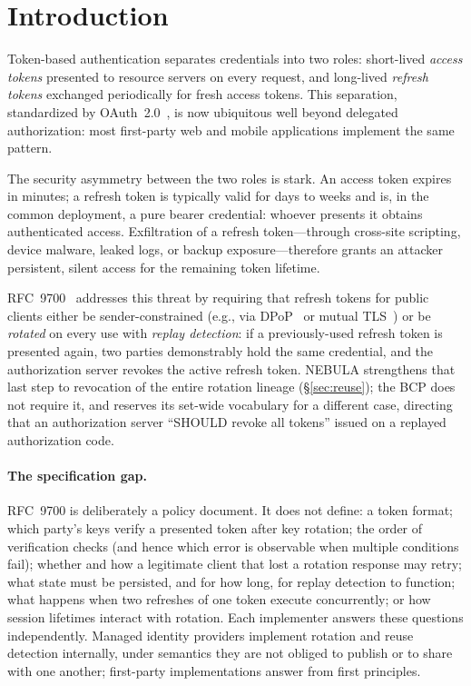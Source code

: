 \documentclass[11pt]{article}
\begin{document}
\section{Introduction}

Token-based authentication separates credentials into two roles: short-lived
\emph{access tokens} presented to resource servers on every request, and
long-lived \emph{refresh tokens} exchanged periodically for fresh access
tokens. This separation, standardized by OAuth~2.0~\cite{rfc6749}, is now
ubiquitous well beyond delegated authorization: most first-party web and
mobile applications implement the same pattern.

The security asymmetry between the two roles is stark. An access token
expires in minutes; a refresh token is typically valid for days to weeks and
is, in the common deployment, a pure bearer credential: whoever presents it
obtains authenticated access. Exfiltration of a refresh token---through
cross-site scripting, device malware, leaked logs, or backup
exposure---therefore grants an attacker persistent, silent access for the
remaining token lifetime.

RFC~9700~\cite{rfc9700} addresses this threat by requiring that refresh
tokens for public clients either be sender-constrained (e.g., via
DPoP~\cite{rfc9449} or mutual TLS~\cite{rfc8705}) or be \emph{rotated} on
every use with \emph{replay detection}: if a previously-used refresh token is
presented again, two parties demonstrably hold the same credential, and the
authorization server revokes the active refresh token. NEBULA strengthens that
last step to revocation of the entire rotation lineage (\S\ref{sec:reuse}); the
BCP does not require it, and reserves its set-wide vocabulary for a different
case, directing that an authorization server ``SHOULD revoke all tokens'' issued
on a replayed authorization code.

\paragraph{The specification gap.}
RFC~9700 is deliberately a policy document. It does not define: a token
format; which party's keys verify a presented token after key rotation; the
order of verification checks (and hence which error is observable when
multiple conditions fail); whether and how a legitimate client that lost a
rotation response may retry; what state must be persisted, and for how long,
for replay detection to function; what happens when two refreshes of one
token execute concurrently; or how session lifetimes interact with rotation.
Each implementer answers these questions independently. Managed identity
providers implement rotation and reuse detection internally, under semantics
they are not obliged to publish or to share with one another; first-party
implementations answer from first principles.
\end{document}
